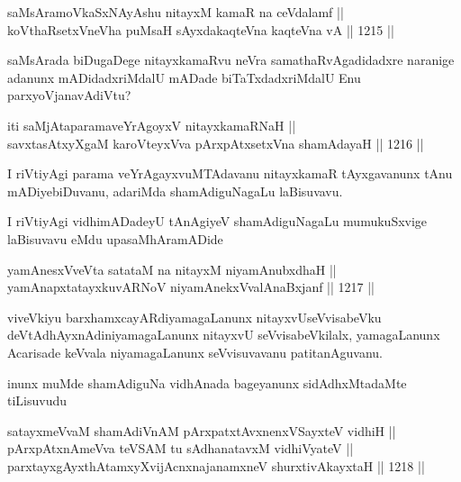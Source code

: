 
\begin{shl}
saMsAramoVkaSxNAyA\s \s shu nitayxM kamaR na ceVdalamf || \\
koV\s thaRsetxVneVha puMsaH sAyxdakaqteVna kaqteVna vA \hfill || 1215 ||  
\end{shl}

\begin{artha}
saMsArada biDugaDege nitayxkamaRvu neVra samathaRvAgadidadxre naranige adanunx mADidadxriMdalU mADade biTaTxdadxriMdalU Enu parxyoVjanavAdiVtu?
\end{artha}

\begin{shl}
iti saMjAtaparamaveYrAgoyxV nitayxkamaRNaH || \\
savxtasAtxyXgaM karoVteyxVva pArxpAtxsetxVna shamAdayaH \hfill || 1216 ||  
\end{shl}

\begin{artha}
I riVtiyAgi parama veYrAgayxvuMTAdavanu nitayxkamaR tAyxgavanunx tAnu mADiyebiDuvanu, adariMda shamAdiguNagaLu laBisuvavu.
\end{artha}

\begin{center}
I riVtiyAgi vidhimADadeyU tAnAgiyeV shamAdiguNagaLu mumukuSxvige laBisuvavu eMdu upasaMhAramADide
\end{center}


\begin{shl}
yamAnesxVveVta satataM na nitayxM niyamAnubxdhaH || \\
yamAnapxtatayxkuvARNoV niyamAnekxVvalAnaBxjanf \hfill || 1217 ||  
\end{shl}

\begin{artha}
viveVkiyu barxhamxcayARdiyamagaLanunx nitayxvUseVvisabeVku deVtAdhAyxnAdiniyamagaLanunx nitayxvU seVvisabeVkilalx, yamagaLanunx Acarisade keVvala niyamagaLanunx seVvisuvavanu patitanAguvanu.
\end{artha}

\begin{center}
inunx muMde shamAdiguNa vidhAnada bageyanunx sidAdhxMtadaMte tiLisuvudu
\end{center}


\begin{shl}
satayxmeVvaM shamAdiVnAM pArxpatxtAvxnenxVSayxteV vidhiH || \\
pArxpAtxnAmeVva teVSAM tu sAdhanatavxM vidhiVyateV || \\
parxtayxgAyxthAtamxyXvijAcnxnajanamxneV shurxtivAkayxtaH \hfill || 1218 ||  
\end{shl}

